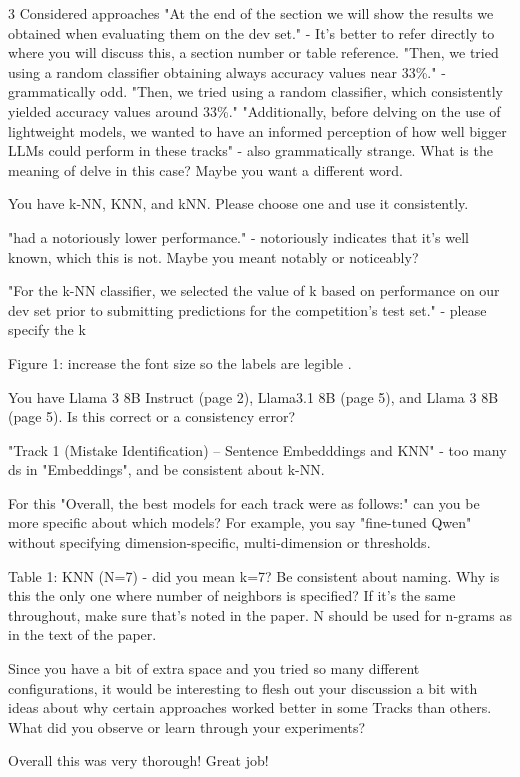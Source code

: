 3 Considered approaches "At the end of the section we will show the results we obtained when evaluating them on the dev set." - It's better to refer directly to where you will discuss this, a section number or table reference. "Then, we tried using a random classifier obtaining always accuracy values near 33\%." - grammatically odd. "Then, we tried using a random classifier, which consistently yielded accuracy values around 33\%." "Additionally, before delving on the use of lightweight models, we wanted to have an informed perception of how well bigger LLMs could perform in these tracks" - also grammatically strange. What is the meaning of delve in this case? Maybe you want a different word.

You have k-NN, KNN, and kNN. Please choose one and use it consistently.

"had a notoriously lower performance." - notoriously indicates that it's well known, which this is not. Maybe you meant notably or noticeably?

"For the k-NN classifier, we selected the value of k based on performance on our dev set prior to submitting predictions for the competition's test set." - please specify the k

Figure 1: increase the font size so the labels are legible .

You have Llama 3 8B Instruct (page 2), Llama3.1 8B (page 5), and Llama 3 8B (page 5). Is this correct or a consistency error?

"Track 1 (Mistake Identification) – Sentence Embedddings and KNN" - too many ds in "Embeddings", and be consistent about k-NN. 

For this "Overall, the best models for each track were as follows:" can you be more specific about which models? For example, you say "fine-tuned Qwen" without specifying dimension-specific, multi-dimension or thresholds.

Table 1: KNN (N=7) - did you mean k=7? Be consistent about naming. Why is this the only one where number of neighbors is specified? If it's the same throughout, make sure that's noted in the paper. N should be used for n-grams as in the text of the paper.

Since you have a bit of extra space and you tried so many different configurations, it would be interesting to flesh out your discussion a bit with ideas about why certain approaches worked better in some Tracks than others. What did you observe or learn through your experiments?

Overall this was very thorough! Great job!